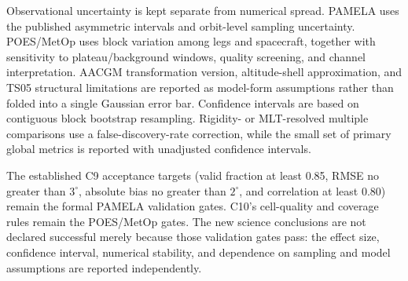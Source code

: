 Observational uncertainty is kept separate from numerical spread. PAMELA uses
the published asymmetric intervals and orbit-level sampling uncertainty.
POES/MetOp uses block variation among legs and spacecraft, together with
sensitivity to plateau/background windows, quality screening, and channel
interpretation. AACGM transformation version, altitude-shell approximation,
and TS05 structural limitations are reported as model-form assumptions rather
than folded into a single Gaussian error bar. Confidence intervals are based
on contiguous block bootstrap resampling. Rigidity- or MLT-resolved multiple
comparisons use a false-discovery-rate correction, while the small set of
primary global metrics is reported with unadjusted confidence intervals.

The established C9 acceptance targets (valid fraction at least 0.85, RMSE no
greater than $3^{\circ}$, absolute bias no greater than $2^{\circ}$, and
correlation at least 0.80) remain the formal PAMELA validation gates. C10's
cell-quality and coverage rules remain the POES/MetOp gates. The new science
conclusions are not declared successful merely because those validation gates
pass: the effect size, confidence interval, numerical stability, and dependence
on sampling and model assumptions are reported independently.

